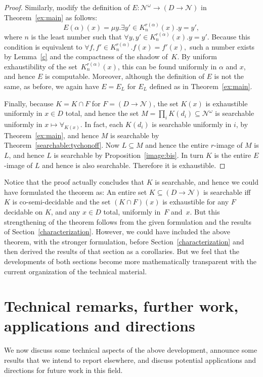 \documentclass{LMCS}
\newcommand{\myomega}{\omega}
\newcommand{\pN}{\mathcal{N}}
\newcommand{\D}{D}
\begin{document}
\begin{proof}
Similarly, modify the definition of $E \colon \pN^\myomega \to (D \to
\pN)$ in Theorem~\ref{ex:main} as follows:
\[
E(\alpha)(x) = 
  \mu y. \exists y' \in K_n^{r(\alpha)}(x).y = y',
\]
where
$n$ is the least number such that $\forall y,y' \in
  K_n^{r(\alpha)}(x).y=y'.$
Because this condition is equivalent to
$\forall f,f' \in K_n^{r(\alpha)}.f(x)=f'(x),$
such a number exists by Lemma~\ref{c} and the compactness of the
  shadow of~$K$. By uniform exhaustibility of the
  set~$K_n^{r(\alpha)}(x)$, this can be found uniformly in $\alpha$
  and $x$, and hence $E$ is computable. Moreover, although the
  definition of $E$ is not the same, as before, we again have $E=E_L$
  for $E_L$ defined as in Theorem~\ref{ex:main}.

  Finally, because $K = K \cap F$ for $F=(\D \to \pN)$, the set $K(x)$
  is exhaustible uniformly in $x \in D$ total, and hence the set $M =
  \prod_i K(d_i) \subseteq \pN^\myomega$ is searchable uniformly in $x
  \mapsto \forall_{K(x)}$.  In fact, each $K(d_i)$ is searchable
  uniformly in $i$, by Theorem~\ref{ex:main}, and hence $M$ is
  searchable by Theorem~\ref{searchable:tychonoff}. Now $L \subseteq
  M$ and hence the entire $r$-image of $M$ is $L$, and hence $L$ is
  searchable by Proposition~\ref{image:bis}. In turn $K$ is the entire
  $E$-image of $L$ and hence is also searchable.  Therefore it is
  exhaustible.
\end{proof}

Notice that the proof actually concludes that $K$ is searchable, and
hence we could have formulated the theorem as: An entire set $K
\subseteq (D \to \pN)$ is searchable iff $K$ is co-semi-decidable and
the set $(K \cap F)(x)$ is exhaustible for any $F$ decidable on $K$,
and any $x \in D$ total, uniformly in~$F$ and~$x$.  But this
strengthening of the theorem follows from the given formulation and
the results of Section~\ref{characterization}. However, we could have
included the above theorem, with the stronger formulation, before
Section~\ref{characterization} and then derived the results of that
section as a corollaries. But we feel that the developments of both
sections become more mathematically transparent with the current
organization of the technical material.

\section{Technical remarks, further work, applications and directions} \label{technical}

We now discuss some technical aspects of the above development,
announce some results that we intend to report elsewhere, and discuss
potential applications and directions for future work in this field.
\end{document}

